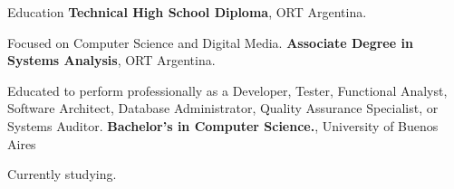 \begin{rubric}{Education}
\entry*[2013 -- 2018]%
	\textbf{Technical High School Diploma}, ORT Argentina.
	\par  Focused on Computer Science and Digital Media.
%
\entry*[2020 -- 2021]%
	\textbf{Associate Degree in Systems Analysis}, ORT Argentina.\par
Educated to perform professionally as a Developer, Tester, Functional Analyst, Software Architect, Database Administrator, Quality Assurance Specialist, or Systems Auditor.
% 
\entry*[2022 -- act.]%
	\textbf{Bachelor's in Computer Science.}, University of Buenos Aires\par
	Currently studying.
\end{rubric}